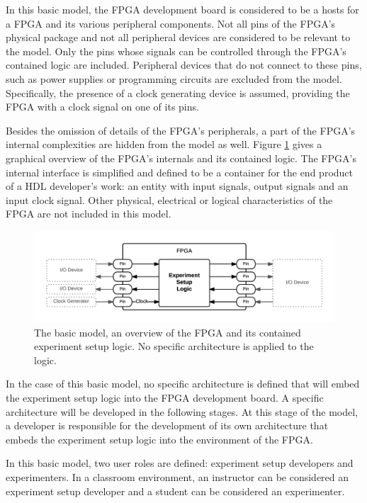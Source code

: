 \documentclass[main.tex]{subfiles}
\begin{document}
In this basic model, the FPGA development board is considered to be a hosts for a FPGA and its various peripheral components. Not all pins of the FPGA's physical package and not all peripheral devices are considered to be relevant to the model. Only the pins whose signals can be controlled through the FPGA's contained logic are included. Peripheral devices that do not connect to these pins, such as power supplies or programming circuits are excluded from the model. Specifically, the presence of a clock generating device is assumed, providing the FPGA with a clock signal on one of its pins. 

Besides the omission of details of the FPGA's peripherals, a part of the FPGA's internal complexities are hidden from the model as well. Figure \ref{fig:fpga-basic} gives a graphical overview of the FPGA's internals and its contained logic. The FPGA's internal interface is simplified and defined to be a container for the end product of a HDL developer's work: an entity with input signals, output signals and an input clock signal. Other physical, electrical or logical characteristics of the FPGA are not included in this model.

\begin{figure}[h]
    \centering
    \caption{The basic model, an overview of the FPGA and its contained experiment setup logic. No specific architecture is applied to the logic.}
    \label{fig:fpga-basic}
    \includegraphics[width=\textwidth]{img/fpga-basic}
\end{figure}

In the case of this basic model, no specific architecture is defined that will embed the experiment setup logic into the FPGA development board. A specific architecture will be developed in the following stages. At this stage of the model, a developer is responsible for the development of its own architecture that embeds the experiment setup logic into the environment of the FPGA.

In this basic model, two user roles are defined: experiment setup developers and experimenters. In a classroom environment, an instructor can be considered an experiment setup developer and a student can be considered an experimenter. 
\end{document}
